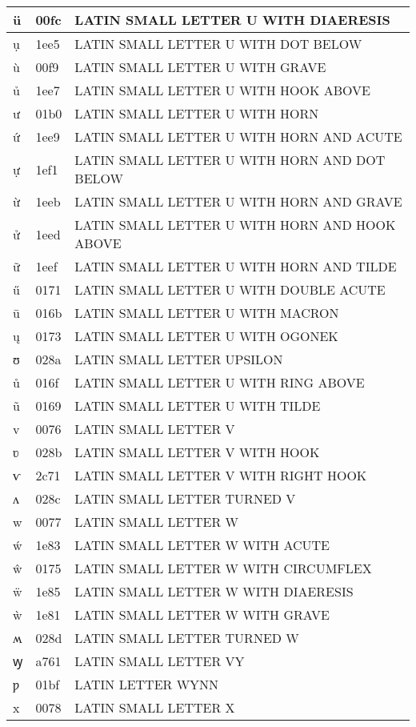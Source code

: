 \documentclass[12pt,letterpaper,openany]{book}
\begin{document}
\begin{center}
\begin{supertabular}{|m{0.25in}|m{0.5in}|m{4in}|}
ü & 00fc & LATIN SMALL LETTER U WITH DIAERESIS\\\hline
ụ & 1ee5 & LATIN SMALL LETTER U WITH DOT BELOW\\\hline
ù & 00f9 & LATIN SMALL LETTER U WITH GRAVE\\\hline
ủ & 1ee7 & LATIN SMALL LETTER U WITH HOOK ABOVE\\\hline
ư & 01b0 & LATIN SMALL LETTER U WITH HORN\\\hline
ứ & 1ee9 & LATIN SMALL LETTER U WITH HORN AND ACUTE\\\hline
ự & 1ef1 & LATIN SMALL LETTER U WITH HORN AND DOT BELOW\\\hline
ừ & 1eeb & LATIN SMALL LETTER U WITH HORN AND GRAVE\\\hline
ử & 1eed & LATIN SMALL LETTER U WITH HORN AND HOOK ABOVE\\\hline
ữ & 1eef & LATIN SMALL LETTER U WITH HORN AND TILDE\\\hline
ű & 0171 & LATIN SMALL LETTER U WITH DOUBLE ACUTE\\\hline
ū & 016b & LATIN SMALL LETTER U WITH MACRON\\\hline
ų & 0173 & LATIN SMALL LETTER U WITH OGONEK\\\hline
ʊ & 028a & LATIN SMALL LETTER UPSILON\\\hline
ů & 016f & LATIN SMALL LETTER U WITH RING ABOVE\\\hline
ũ & 0169 & LATIN SMALL LETTER U WITH TILDE\\\hline
v & 0076 & LATIN SMALL LETTER V\\\hline
ʋ & 028b & LATIN SMALL LETTER V WITH HOOK\\\hline
ⱱ & 2c71 & LATIN SMALL LETTER V WITH RIGHT HOOK\\\hline
ʌ & 028c & LATIN SMALL LETTER TURNED V\\\hline
w & 0077 & LATIN SMALL LETTER W\\\hline
ẃ & 1e83 & LATIN SMALL LETTER W WITH ACUTE\\\hline
ŵ & 0175 & LATIN SMALL LETTER W WITH CIRCUMFLEX\\\hline
ẅ & 1e85 & LATIN SMALL LETTER W WITH DIAERESIS\\\hline
ẁ & 1e81 & LATIN SMALL LETTER W WITH GRAVE\\\hline
ʍ & 028d & LATIN SMALL LETTER TURNED W\\\hline
ꝡ & a761 & LATIN SMALL LETTER VY\\\hline
ƿ & 01bf & LATIN LETTER WYNN\\\hline
x & 0078 & LATIN SMALL LETTER X\\\hline

\end{supertabular}
\end{center}
\end{document}
